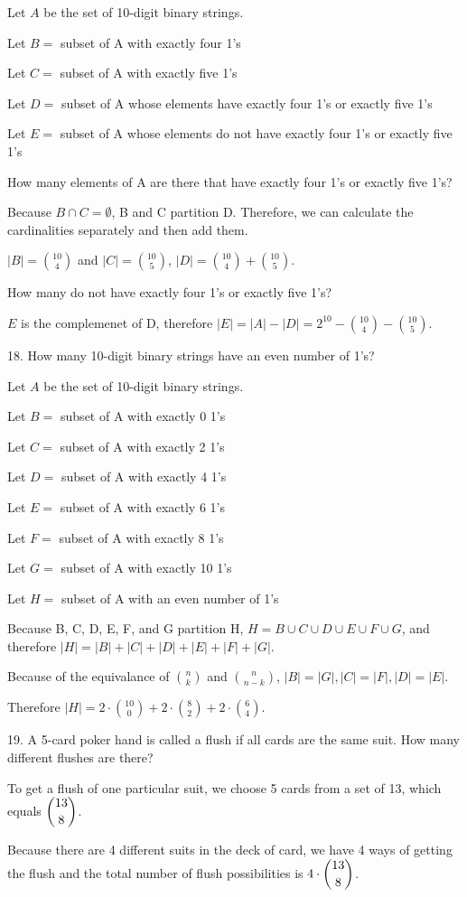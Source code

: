 \documentclass{hippoidC}
\begin{document}
\begin{prooflist}{ Let $A$ be the set of 10-digit binary strings. }
	\item Let $B=$ subset of A with exactly four 1's
	\item Let $C=$ subset of A with exactly five 1's
	\item Let $D=$ subset of A whose elements have exactly four 1’s or exactly five 1’s
	\item Let $E=$ subset of A whose elements do not have exactly four 1’s or exactly five 1’s
	\item How many elements of A are there that have exactly four 1’s or exactly five 1’s?
	\item Because $B \cap C=\emptyset$, B and C partition D. Therefore, we can
	calculate the cardinalities separately and then add them.
	\item $|B|=\binom{10}{4}$ and $|C|=\binom{10}{5}$, $|D|= \binom{10}{4}+\binom{10}{5}$.
	\item How many do not have exactly four 1’s or exactly five 1’s?
	\item $E$ is the complemenet of D, therefore $|E| = |A| - |D| = 2^{10} -
		\binom{10}{4}-\binom{10}{5}$.
\end{prooflist}

\begin{prooflist}{18. How many 10-digit binary strings have an even number of 1’s?}
	\item Let $A$ be the set of 10-digit binary strings.
	\item Let $B=$ subset of A with exactly 0 1's
	\item Let $C=$ subset of A with exactly 2 1's
	\item Let $D=$ subset of A with exactly 4 1's
	\item Let $E=$ subset of A with exactly 6 1's
	\item Let $F=$ subset of A with exactly 8 1's
	\item Let $G=$ subset of A with exactly 10 1's
	\item Let $H=$ subset of A with an even number of 1's
	\item Because B, C, D, E, F, and G partition H, $H=B\cup C\cup D\cup E \cup
		F \cup G$, and therefore $|H|=|B| + |C| + |D| + |E| + |F| + |G|$.
	\item Because of the equivalance of $\binom{n}{k}$ and $\binom{n}{n-k}$,
	$|B|=|G|, |C|=|F|, |D|=|E|$.
	\item Therefore $|H| =
		2\cdot \binom{10}{0} +
		2\cdot \binom{8}{2} +
		2\cdot \binom{6}{4}$.
\end{prooflist}

\begin{prooflist}{19. A 5-card poker hand is called a flush if all cards are the same suit. How many different flushes are there?}
	\item To get a flush of one particular suit, we choose 5 cards from a set of 13,
	which equals $\dbinom{13}{8}$.
	\item Because there are 4 different suits in the deck of card, we have 4 ways of
	getting the flush and the total number of flush possibilities is $4 \cdot
		\dbinom{13}{8}$.
\end{prooflist}
\end{document}
